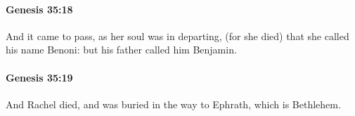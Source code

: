 		\paragraph{Genesis 35:18} %
			\label{GENESIS-35-18}

			And it came to pass, as her soul was in departing, (for she died) that she called his name Benoni: but his father called him Benjamin.


		\paragraph{Genesis 35:19} %
			\label{GENESIS-35-19}

			And Rachel died, and was buried in the way to Ephrath, which is Bethlehem.


